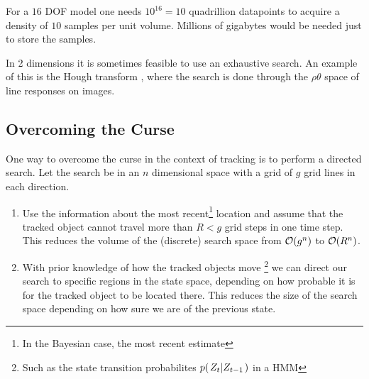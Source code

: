 \begin{example} For a $16$ DOF model one needs $10^{16}=10$
quadrillion datapoints to acquire a density of $10$ samples per unit
volume. Millions of gigabytes would be needed just to store the
samples.
\end{example}

\begin{example} In 2 dimensions it is sometimes feasible to use an
exhaustive search.  An example of this is the Hough transform
\cite{DigitalImageProcessing}, where the search is done through the
$\rho\theta$ space of line responses on images.
\end{example}

\subsection{Overcoming the Curse} One way to overcome the curse in the
context of tracking is to perform a directed search. Let the search be
in an $n$ dimensional space with a grid of $g$ grid lines in each
direction.

\begin{enumerate}
\item Use the information about the most recent\footnote{In the
    Bayesian case, the most recent estimate} location and assume that
  the tracked object cannot travel more than $R < g$ grid steps in one
  time step.  This reduces the volume of the (discrete) search space
  from $\mathcal{O}{\left(g^n\right)}$ to $\mathcal{O}{\left(R^n\right)}$.
\item With prior knowledge of how the tracked objects move
  \footnote{Such as the state transition probabilites $p{(\left. Z_t \middle\vert Z_{t-1} \right.)}$
    in a HMM} we can direct our search to specific regions in the
  state space, depending on how probable it is for the tracked object
  to be located there. This reduces the size of the search space
  depending on how sure we are of the previous state.
\end{enumerate}


